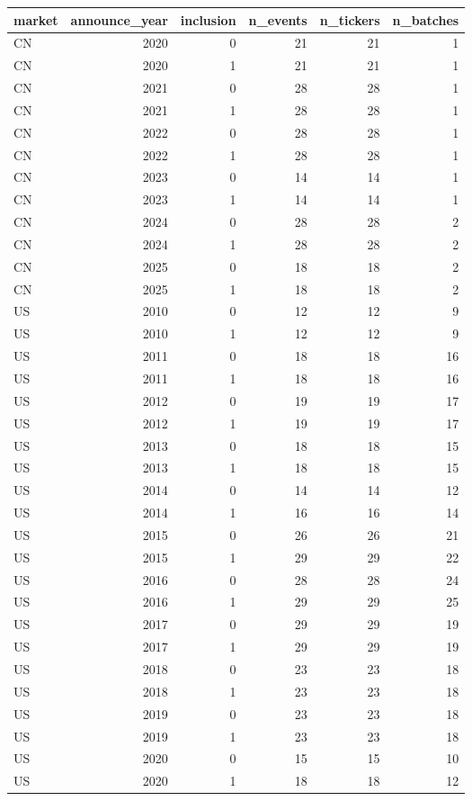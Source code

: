 \begin{tabular}{lrrrrr}
\toprule
market & announce_year & inclusion & n_events & n_tickers & n_batches \\
\midrule
CN & 2020 & 0 & 21 & 21 & 1 \\
CN & 2020 & 1 & 21 & 21 & 1 \\
CN & 2021 & 0 & 28 & 28 & 1 \\
CN & 2021 & 1 & 28 & 28 & 1 \\
CN & 2022 & 0 & 28 & 28 & 1 \\
CN & 2022 & 1 & 28 & 28 & 1 \\
CN & 2023 & 0 & 14 & 14 & 1 \\
CN & 2023 & 1 & 14 & 14 & 1 \\
CN & 2024 & 0 & 28 & 28 & 2 \\
CN & 2024 & 1 & 28 & 28 & 2 \\
CN & 2025 & 0 & 18 & 18 & 2 \\
CN & 2025 & 1 & 18 & 18 & 2 \\
US & 2010 & 0 & 12 & 12 & 9 \\
US & 2010 & 1 & 12 & 12 & 9 \\
US & 2011 & 0 & 18 & 18 & 16 \\
US & 2011 & 1 & 18 & 18 & 16 \\
US & 2012 & 0 & 19 & 19 & 17 \\
US & 2012 & 1 & 19 & 19 & 17 \\
US & 2013 & 0 & 18 & 18 & 15 \\
US & 2013 & 1 & 18 & 18 & 15 \\
US & 2014 & 0 & 14 & 14 & 12 \\
US & 2014 & 1 & 16 & 16 & 14 \\
US & 2015 & 0 & 26 & 26 & 21 \\
US & 2015 & 1 & 29 & 29 & 22 \\
US & 2016 & 0 & 28 & 28 & 24 \\
US & 2016 & 1 & 29 & 29 & 25 \\
US & 2017 & 0 & 29 & 29 & 19 \\
US & 2017 & 1 & 29 & 29 & 19 \\
US & 2018 & 0 & 23 & 23 & 18 \\
US & 2018 & 1 & 23 & 23 & 18 \\
US & 2019 & 0 & 23 & 23 & 18 \\
US & 2019 & 1 & 23 & 23 & 18 \\
US & 2020 & 0 & 15 & 15 & 10 \\
US & 2020 & 1 & 18 & 18 & 12 \\

\end{tabular}
